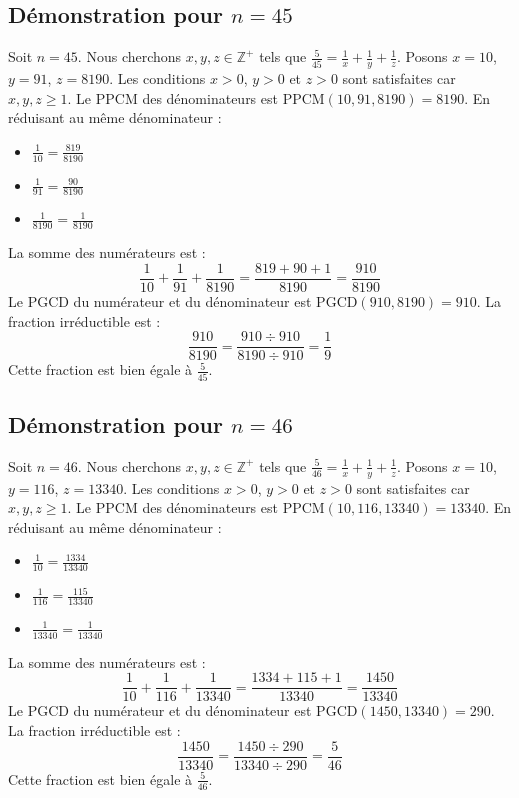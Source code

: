 \documentclass[11pt,a4paper]{article}
\begin{document}
\subsection{Démonstration pour $n = 45$}
Soit $n = 45$. Nous cherchons $x, y, z \in \mathbb{Z}^{+}$ tels que $\frac{5}{45} = \frac{1}{x} + \frac{1}{y} + \frac{1}{z}$.
Posons $x = 10$, $y = 91$, $z = 8190$.
Les conditions $x > 0$, $y > 0$ et $z > 0$ sont satisfaites car $x, y, z \geq 1$.
Le PPCM des dénominateurs est $\text{PPCM}(10, 91, 8190) = 8190$.
En réduisant au même dénominateur :
\begin{itemize}
    \item $\frac{1}{10} = \frac{819}{8190}$
    \item $\frac{1}{91} = \frac{90}{8190}$
    \item $\frac{1}{8190} = \frac{1}{8190}$
\end{itemize}
La somme des numérateurs est :
$$ \frac{1}{10} + \frac{1}{91} + \frac{1}{8190} = \frac{819 + 90 + 1}{8190} = \frac{910}{8190} $$
Le PGCD du numérateur et du dénominateur est $\text{PGCD}(910, 8190) = 910$.
La fraction irréductible est :
$$ \frac{910}{8190} = \frac{910 \div 910}{8190 \div 910} = \frac{1}{9} $$
Cette fraction est bien égale à $\frac{5}{45}$.

\subsection{Démonstration pour $n = 46$}
Soit $n = 46$. Nous cherchons $x, y, z \in \mathbb{Z}^{+}$ tels que $\frac{5}{46} = \frac{1}{x} + \frac{1}{y} + \frac{1}{z}$.
Posons $x = 10$, $y = 116$, $z = 13340$.
Les conditions $x > 0$, $y > 0$ et $z > 0$ sont satisfaites car $x, y, z \geq 1$.
Le PPCM des dénominateurs est $\text{PPCM}(10, 116, 13340) = 13340$.
En réduisant au même dénominateur :
\begin{itemize}
    \item $\frac{1}{10} = \frac{1334}{13340}$
    \item $\frac{1}{116} = \frac{115}{13340}$
    \item $\frac{1}{13340} = \frac{1}{13340}$
\end{itemize}
La somme des numérateurs est :
$$ \frac{1}{10} + \frac{1}{116} + \frac{1}{13340} = \frac{1334 + 115 + 1}{13340} = \frac{1450}{13340} $$
Le PGCD du numérateur et du dénominateur est $\text{PGCD}(1450, 13340) = 290$.
La fraction irréductible est :
$$ \frac{1450}{13340} = \frac{1450 \div 290}{13340 \div 290} = \frac{5}{46} $$
Cette fraction est bien égale à $\frac{5}{46}$.
\end{document}
